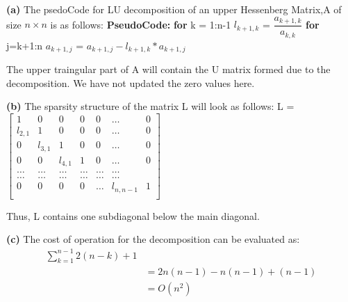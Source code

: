 \documentclass{article}
\renewcommand\part[1]{\vspace{.10in}\textbf{(#1)}}
\newcommand\pseudoCode{\vspace{.10in}\textbf{PseudoCode: }}
\begin{document}
\part{a}
The psedoCode for LU decomposition of an upper Hessenberg Matrix,A of size $n \times n$ is as follows:\newline
\pseudoCode \newline
\hspace*{0.5cm} \textbf {for} k = 1:n-1 \newline
\hspace*{1cm}      $l_{k+1,k}$ = $\dfrac{a_{k+1,k}}{a_{k,k}}$ \newline
\hspace*{1cm}    \textbf {for} j=k+1:n \newline
\hspace*{1.5cm}     $ a_{k+1,j}$ = $a_{k+1,j} - l_{k+1,k}*a_{k+1,j}$ \newline

The upper traingular part of A will contain the U matrix formed due to the decomposition. We have not updated the zero values here. 

\part{b}
The sparsity structure of the matrix L will look as follows: \newline
L = $\begin{bmatrix} 
1 & 0 & 0 & 0 & 0 &\dots & 0 \\
l_{2,1} & 1 & 0 & 0 & 0 &\dots & 0 \\
0 & l_{3,1} & 1 & 0 & 0 & \dots & 0 \\
0 & 0 & l_{4,1} & 1 & 0 & \dots & 0 \\
\dots & \dots & \dots & \dots & \dots & \dots \\
\dots & \dots & \dots & \dots & \dots & \dots \\
0 & 0 & 0 & 0 & \dots &    l_{n,n-1} & 1 \\

\end{bmatrix}$

Thus, L contains one subdiagonal below the main diagonal. \newline

\part{c} 
The cost of operation for the decomposition  can be evaluated as: \newline
\begin{align*}
   \sum_{k=1}^{n-1} 2(n-k) + 1 \\
   &= 2n(n-1) -n(n-1) + (n-1) \\
   &= O(n^2) \\
\end{align*}
   
\end{document}

